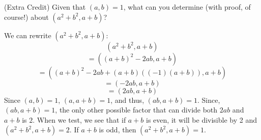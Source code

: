 \documentclass{article}
\begin{document}
\begin{problem}{(Extra Credit)}{}
    Given that $(a, b) = 1$, what can you determine (with proof, of course!) about $(a^2 + b^2, a + b)$?
\end{problem}
\begin{solution}{}{}
    We can rewrite $(a^2 + b^2, a + b)$:
    \[(a^2 + b^2, a + b)\]
    \[=((a + b)^2-2ab, a + b)\]
    \[=((a + b)^2-2ab+(a+b)((-1)(a+b)), a + b)\]
    \[=(-2ab, a + b)\]
    \[=(2ab, a + b)\]
    Since $(a,b)=1$, $(a,a+b)=1$, and thus, $(ab,a+b)=1$. Since, $(ab,a+b)=1$, the only other possible factor that can divide both $2ab$ and $a+b$ is $2$. When we test, we see that if $a+b$ is even, it will be divisible by 2 and $(a^2 + b^2, a + b)=2$. If $a+b$ is odd, then $(a^2 + b^2, a + b)=1$.
\end{solution}
\end{document}
